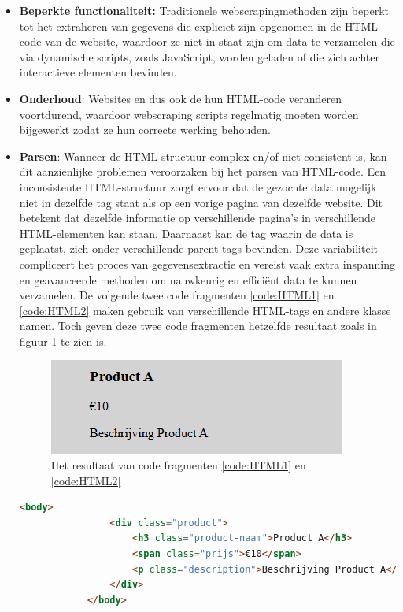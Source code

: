 \begin{itemize}
    \item \textbf{Beperkte functionaliteit: }Traditionele webscrapingmethoden zijn beperkt tot het extraheren van gegevens die expliciet zijn opgenomen in de HTML-code van de website, waardoor ze niet in staat zijn om data te verzamelen die via dynamische scripts, zoals JavaScript, worden geladen of die zich achter interactieve elementen bevinden.

    \item \textbf{Onderhoud}: Websites en dus ook de hun HTML-code veranderen voortdurend, waardoor webscraping scripts regelmatig moeten worden bijgewerkt zodat ze hun correcte werking behouden.

    \item \textbf{Parsen}: Wanneer de HTML-structuur complex en/of niet consistent is, kan dit aanzienlijke problemen veroorzaken bij het parsen van HTML-code. Een inconsistente HTML-structuur zorgt ervoor dat de gezochte data mogelijk niet in dezelfde tag staat als op een vorige pagina van dezelfde website. Dit betekent dat dezelfde informatie op verschillende pagina's in verschillende HTML-elementen kan staan. Daarnaast kan de tag waarin de data is geplaatst, zich onder verschillende parent-tags bevinden. Deze variabiliteit compliceert het proces van gegevensextractie en vereist vaak extra inspanning en geavanceerde methoden om nauwkeurig en efficiënt data te kunnen verzamelen.
    De volgende twee code fragmenten \ref{code:HTML1}  en \ref{code:HTML2} maken gebruik van verschillende HTML-tags en andere klasse namen. Toch geven deze twee code fragmenten hetzelfde resultaat zoals in figuur \ref{fig:inconsistente HTML}  te zien is.

    \begin{figure}[h]
        \centering
        \includegraphics{graphics/HTML-voorbeeld.png}
        \caption{Het resultaat van code fragmenten \ref{code:HTML1} en \ref{code:HTML2}}
        \label{fig:inconsistente HTML}
    \end{figure}

    \begin{listing}
        \begin{lstlisting}[language=HTML, caption={HTML voorbeeld 1},label={code:HTML1}]
            <body>
                <div class="product">
                    <h3 class="product-naam">Product A</h3>
                    <span class="prijs">€10</span>
                    <p class="description">Beschrijving Product A</p>
                </div>
            </body>
        \end{lstlisting}


\end{listing}
\end{itemize}
